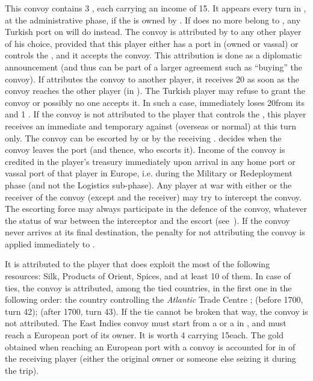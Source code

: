 \label{chIncomes:Levant Convoy} This
convoy %
contains 3 \NTD, each carrying an income of 15\ducats.  It appears every turn
in , at the administrative phase, if the  is
owned by \TUR.
\bparag If  does no more belong to \TUR, any Turkish port on
 will do instead.
\bparag The convoy is attributed by \TUR to any other player of his choice,
provided that this player either has a port in  (owned or
vassal) or controls the , and it accepts the convoy. This
attribution is done as a diplomatic announcement (and thus can be part of a
larger agreement such as ``buying'' the convoy).
\bparag If \TUR attributes the convoy to another player, it receives 20\ducats
as soon as the convoy reaches the other player (in ).
\bparag The Turkish player may refuse to grant the convoy or possibly no one
accepts it. In such a case, \TUR immediately loses 20\ducats from its \RT and
1 \STAB.
\bparag If the convoy is not attributed to the player that controls the
, this player receives an immediate and temporary \CB
against \TUR (overseas or normal) at this turn only.
\bparag The convoy can be escorted by \TUR or by the receiving \MAJ. \TUR
decides when the convoy leaves the port (and thence, who escorts it).
\bparag Income of the convoy is credited in the player's treasury immediately
upon arrival in any home port or vassal port of that player in Europe,
i.e. during the Military or Redeployment phase (and not the Logistics
sub-phase).
\bparag Any player at war with either \TUR or the receiver of the convoy
(except \TUR and the receiver) may try to intercept the convoy. The escorting
force may always participate in the defence of the convoy, whatever the status
of war between the interceptor and the escort
(see~).
\bparag If the convoy never arrives at its final destination, the penalty for
not attributing the convoy is applied immediately to \TUR.

 It is attributed to the player that does exploit
the most of the following resources: Silk, Products of Orient, Spices, and at
least 10 of them.
\bparag In case of ties, the convoy is attributed, among the tied countries,
in the first one in the following order: the country controlling
the \emph{Atlantic} Trade Centre ; \HOL (before 1700, turn 42); \ANG (after
1700, turn 43). If the tie cannot be broken that way, the convoy is not
attributed.
\bparag The East Indies convoy must start from a \COL\faceplus or a
\TP\faceplus in , and must reach a European port of its
owner. It is worth 4 \NTD carrying 15\ducats each.
\bparag The gold obtained when reaching an European port with a convoy is
accounted for in  of the receiving
player (either the original owner or someone else seizing it during the
trip).

